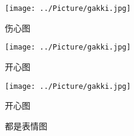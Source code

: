 \documentclass[a4paper,UTF8]{article}
\begin{document}
\begin{figure}[ht]
\begin{minipage}{0.3\linewidth}
\centerline{\texttt{[image: ../Picture/gakki.jpg]}}
\centerline{伤心图}
\end{minipage}
\quad
\begin{minipage}{0.3\linewidth}
\centerline{\texttt{[image: ../Picture/gakki.jpg]}}
\centerline{开心图}
\end{minipage}
\quad
\begin{minipage}{0.3\linewidth}
\centerline{\texttt{[image: ../Picture/gakki.jpg]}}
\centerline{开心图}
\end{minipage}
\caption*{都是表情图}
\end{figure}
\end{document}
